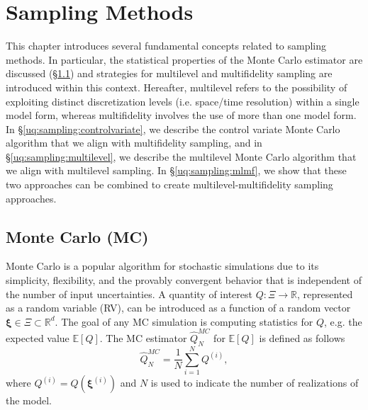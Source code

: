 \chapter{Sampling Methods}\label{uq:sampling}

This chapter introduces several fundamental concepts related to
sampling methods. In particular, the statistical properties of the
Monte Carlo estimator are discussed
(\S\ref{uq:sampling:montecarlo}) and strategies for multilevel and
multifidelity sampling are introduced within this context. Hereafter,
multilevel refers to the possibility of exploiting distinct
discretization levels (i.e. space/time resolution) within a single
model form, whereas multifidelity involves the use of more than one
model form.  In \S\ref{uq:sampling:controlvariate}, we describe the
control variate Monte Carlo algorithm that we align with multifidelity
sampling, and in \S\ref{uq:sampling:multilevel}, we describe the
multilevel Monte Carlo algorithm that we align with multilevel
sampling.  In \S\ref{uq:sampling:mlmf}, we show that these two
approaches can be combined to create multilevel-multifidelity sampling
approaches.

\section{Monte Carlo (MC)} \label{uq:sampling:montecarlo}
Monte Carlo is a popular algorithm for stochastic simulations due to its simplicity, flexibility, and the provably convergent behavior that is independent 
of the number of input uncertainties. A quantity of interest $Q: \Xi \rightarrow \mathbb{R}$, represented as a random variable (RV), 
can be introduced as a function of a random vector $\boldsymbol{\xi} \in \Xi \subset \mathbb{R}^d$. The goal of any MC simulation is computing 
statistics for $Q$, e.g. the expected value $\mathbb{E}\left[Q\right]$. The MC estimator $\hat{Q}_N^{MC}$ for 
$\mathbb{E}\left[Q\right]$ is defined as follows
\begin{equation}
\hat{Q}_N^{MC} = \dfrac{1}{N} \sum_{i=1}^N Q^{(i)},
\end{equation}
where $Q^{(i)} = Q(\boldsymbol{\xi}^{(i)})$ and $N$ is used to indicate the number of realizations of the model. 

